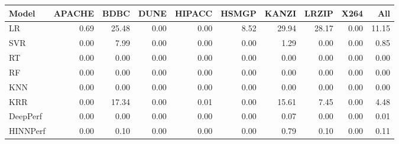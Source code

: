 \begin{tabular}{lrrrrrrrrr}
\toprule
Model & APACHE & BDBC & DUNE & HIPACC & HSMGP & KANZI & LRZIP & X264 & All \\
\midrule
LR & 0.69 & 25.48 & 0.00 & 0.00 & 8.52 & 29.94 & 28.17 & 0.00 & 11.15 \\
SVR & 0.00 & 7.99 & 0.00 & 0.00 & 0.00 & 1.29 & 0.00 & 0.00 & 0.85 \\
RT & 0.00 & 0.00 & 0.00 & 0.00 & 0.00 & 0.00 & 0.00 & 0.00 & 0.00 \\
RF & 0.00 & 0.00 & 0.00 & 0.00 & 0.00 & 0.00 & 0.00 & 0.00 & 0.00 \\
KNN & 0.00 & 0.00 & 0.00 & 0.00 & 0.00 & 0.00 & 0.00 & 0.00 & 0.00 \\
KRR & 0.00 & 17.34 & 0.00 & 0.01 & 0.00 & 15.61 & 7.45 & 0.00 & 4.48 \\
DeepPerf & 0.00 & 0.00 & 0.00 & 0.00 & 0.00 & 0.07 & 0.00 & 0.00 & 0.01 \\
HINNPerf & 0.00 & 0.10 & 0.00 & 0.00 & 0.00 & 0.79 & 0.10 & 0.00 & 0.11 \\
\bottomrule
\end{tabular}
